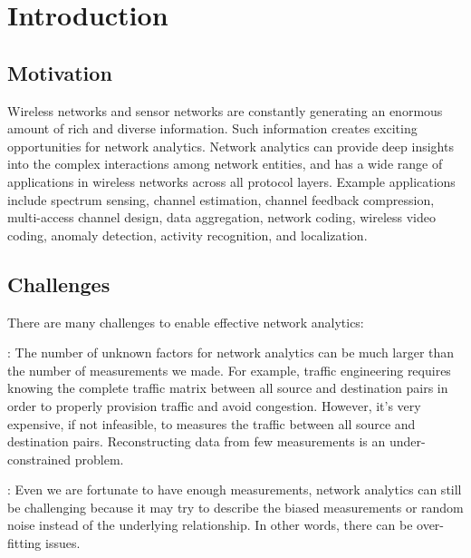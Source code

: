 \chapter{Introduction}
%
\label{sec:intro}


\section{Motivation}
\label{sec:intro_motivation}

Wireless networks and sensor networks are constantly generating an enormous amount of rich and diverse information. Such information creates exciting opportunities for network analytics. Network analytics can provide deep insights into the complex interactions among network entities, and has a wide range of applications in wireless networks across all protocol layers. Example applications include spectrum sensing, channel estimation, channel feedback compression, multi-access channel design, data aggregation, network coding, wireless video coding, anomaly detection, activity recognition, and localization.


\section{Challenges}
\label{sec:intro_challenge}

There are many challenges to enable effective network analytics:

: The number of unknown factors for network analytics can be much larger than the number of measurements we made. For example, traffic engineering requires knowing the complete traffic matrix between all source and destination pairs in order to properly provision traffic and avoid congestion. However, it's very expensive, if not infeasible, to measures the traffic between all source and destination pairs. Reconstructing data from few measurements is an under-constrained problem. 

: Even we are fortunate to have enough measurements, network analytics can still be challenging because it may try to describe the biased measurements or random noise instead of the underlying relationship. In other words, there can be over-fitting issues.

